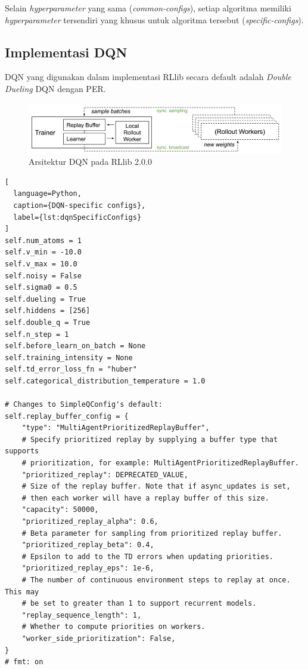 Selain \emph{hyperparameter} yang sama (\emph{common-configs}), setiap algoritma memiliki \emph{hyperparameter}
tersendiri yang khusus untuk algoritma tersebut (\emph{specific-configs}).

\subsection{Implementasi DQN}
DQN yang digunakan dalam implementasi RLlib secara default adalah \emph{Double Dueling} DQN
dengan PER.

\begin{figure}[H]
  \centering
    \includegraphics[scale=0.6]{gambar/rllib_dqn_architecture.png}
    \caption{Arsitektur DQN pada RLlib 2.0.0 \citep{rllibDocumentation}}
    \label{fig:rllib_dqn_architecture}
\end{figure}

\begin{lstlisting}[
  language=Python,
  caption={DQN-specific configs},
  label={lst:dqnSpecificConfigs}
]
self.num_atoms = 1
self.v_min = -10.0
self.v_max = 10.0
self.noisy = False
self.sigma0 = 0.5
self.dueling = True
self.hiddens = [256]
self.double_q = True
self.n_step = 1
self.before_learn_on_batch = None
self.training_intensity = None
self.td_error_loss_fn = "huber"
self.categorical_distribution_temperature = 1.0

# Changes to SimpleQConfig's default:
self.replay_buffer_config = {
    "type": "MultiAgentPrioritizedReplayBuffer",
    # Specify prioritized replay by supplying a buffer type that supports
    # prioritization, for example: MultiAgentPrioritizedReplayBuffer.
    "prioritized_replay": DEPRECATED_VALUE,
    # Size of the replay buffer. Note that if async_updates is set,
    # then each worker will have a replay buffer of this size.
    "capacity": 50000,
    "prioritized_replay_alpha": 0.6,
    # Beta parameter for sampling from prioritized replay buffer.
    "prioritized_replay_beta": 0.4,
    # Epsilon to add to the TD errors when updating priorities.
    "prioritized_replay_eps": 1e-6,
    # The number of continuous environment steps to replay at once. This may
    # be set to greater than 1 to support recurrent models.
    "replay_sequence_length": 1,
    # Whether to compute priorities on workers.
    "worker_side_prioritization": False,
}
# fmt: on
\end{lstlisting}

